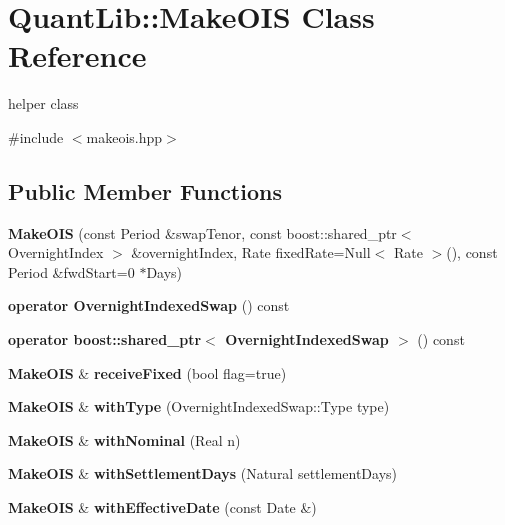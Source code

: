 \section{Quant\+Lib\+:\+:Make\+O\+IS Class Reference}
\label{class_quant_lib_1_1_make_o_i_s}


helper class  




{\ttfamily \#include $<$makeois.\+hpp$>$}

\subsection*{Public Member Functions}
\begin{DoxyCompactItemize}
\item 
{\bfseries Make\+O\+IS} (const Period \&swap\+Tenor, const boost\+::shared\+\_\+ptr$<$ Overnight\+Index $>$ \&overnight\+Index, Rate fixed\+Rate=Null$<$ Rate $>$(), const Period \&fwd\+Start=0 $\ast$Days)\label{class_quant_lib_1_1_make_o_i_s_a86939d48db185f7251f9a8f46afcf010}

\item 
{\bfseries operator Overnight\+Indexed\+Swap} () const \label{class_quant_lib_1_1_make_o_i_s_a3bc8d5966dfe1dd532f5a363b3e91226}

\item 
{\bfseries operator boost\+::shared\+\_\+ptr$<$ Overnight\+Indexed\+Swap $>$} () const \label{class_quant_lib_1_1_make_o_i_s_aca29b340a93348f392d0637d0cd61310}

\item 
{\bf Make\+O\+IS} \& {\bfseries receive\+Fixed} (bool flag=true)\label{class_quant_lib_1_1_make_o_i_s_a443214f36121ab2d83c6c119263e9858}

\item 
{\bf Make\+O\+IS} \& {\bfseries with\+Type} (Overnight\+Indexed\+Swap\+::\+Type type)\label{class_quant_lib_1_1_make_o_i_s_a7741f4eaaf325a5376fa2a1e9d6463fd}

\item 
{\bf Make\+O\+IS} \& {\bfseries with\+Nominal} (Real n)\label{class_quant_lib_1_1_make_o_i_s_ad392420dd3130cd0d055675c54cb23ac}

\item 
{\bf Make\+O\+IS} \& {\bfseries with\+Settlement\+Days} (Natural settlement\+Days)\label{class_quant_lib_1_1_make_o_i_s_abcee7089678f162e84a97bc96d6b4650}

\item 
{\bf Make\+O\+IS} \& {\bfseries with\+Effective\+Date} (const Date \&)\label{class_quant_lib_1_1_make_o_i_s_ac87a2e86344a07e2036a4d48ef92fd06}


\end{DoxyCompactItemize}
